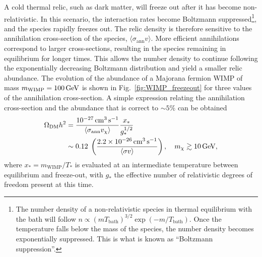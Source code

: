 A cold thermal relic, such as dark matter, will freeze out after it has become non-relativistic. In this scenario, the interaction rates become Boltzmann suppressed\footnote{The number density of a non-relativistic species in thermal equilibrium with the bath will follow $n \propto \left(m T_\mathrm{bath}\right)^{3/2} \exp\left(-m /T_\mathrm{bath}\right)$. Once the temperature falls below the mass of the species, the number density becomes exponentially suppressed. This is what is known as ``Boltzmann suppression''.}, and the species rapidly freezes out. The relic density is therefore sensitive to the annihilation cross-section of the species, $\langle \sigma_\mathrm{ann} v\rangle$. More efficient annihilations correspond to larger cross-sections, resulting in the species remaining in equilibrium for longer times. This allows the number density to continue following the exponentially decreasing Boltzmann distribution and yield a smaller relic abundance. The evolution of the abundance of a Majorana fermion WIMP of mass $m_\mathrm{WIMP} = 100{\rm \,GeV}$ is shown in Fig.~\ref{fig:WIMP_freezeout} for three values of the annihilation cross-section. A simple expression  relating the annihilation cross-section and the abundance that is correct to $\sim5\%$ can be obtained~\cite{Steigman:2012nb_PreciseRelicWIMP} 
\begin{align}
    \Omega_{\mathrm{DM}}h^2 & = \frac{10^{-27}{\rm \,cm}^3{\rm \,s}^{-1}}{\langle \sigma_{\rm ann} v_\chi \rangle} \frac{x_*}{g_*^{1/2}}\\
     &\sim 0.12 \; \left(\frac{2.2\times 10^{-26}{\rm \,cm}^3 {\rm \,s}^{-1}}{\langle \sigma v\rangle}\right),\quad m_\chi\gtrsim 10{\rm \,GeV},
\end{align}
where $x_* = m_\mathrm{WIMP}/T_*$ is evaluated at an intermediate temperature between equilibrium and freeze-out, with $g_*$ the effective number of relativistic degrees of freedom present at this time. 

